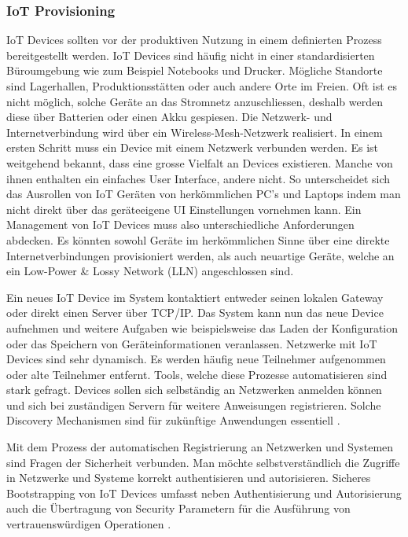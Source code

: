 \subsubsection{IoT Provisioning} IoT Devices sollten vor der produktiven Nutzung in einem definierten Prozess bereitgestellt werden. IoT Devices sind häufig nicht in einer standardisierten Büroumgebung wie zum Beispiel Notebooks und Drucker. Mögliche Standorte sind Lagerhallen, Produktionsstätten oder auch andere Orte im Freien. Oft ist es nicht möglich, solche Geräte an das Stromnetz anzuschliessen, deshalb werden diese über Batterien oder einen Akku gespiesen. Die Netzwerk- und Internetverbindung wird über ein Wireless-Mesh-Netzwerk realisiert. In einem ersten Schritt muss ein Device mit einem Netzwerk verbunden werden. Es ist weitgehend bekannt, dass eine grosse Vielfalt an Devices existieren. Manche von ihnen enthalten ein einfaches User Interface, andere nicht. So unterscheidet sich das Ausrollen von IoT Geräten von herkömmlichen PC's und Laptops indem man nicht direkt über das geräteeigene UI Einstellungen vornehmen kann. Ein Management von IoT Devices muss also unterschiedliche Anforderungen abdecken. Es könnten sowohl Geräte im herkömmlichen Sinne über eine direkte Internetverbindungen provisioniert werden, als auch neuartige Geräte, welche an ein Low-Power \& Lossy Network (LLN) angeschlossen sind.     

Ein neues IoT Device im System kontaktiert entweder seinen lokalen Gateway oder direkt einen Server über TCP/IP. Das System kann nun das neue Device aufnehmen und weitere Aufgaben wie beispielsweise das Laden der Konfiguration oder das Speichern von Geräteinformationen veranlassen. Netzwerke mit IoT Devices sind sehr dynamisch. Es werden häufig neue Teilnehmer aufgenommen oder alte Teilnehmer entfernt. Tools, welche diese Prozesse automatisieren sind stark gefragt. Devices sollen sich selbständig an Netzwerken anmelden können und sich bei zuständigen Servern für weitere Anweisungen registrieren. Solche Discovery Mechanismen sind für zukünftige Anwendungen essentiell \cite{IoTDiscovery10}.

Mit dem Prozess der automatischen Registrierung an Netzwerken und Systemen sind Fragen der Sicherheit verbunden. Man möchte selbstverständlich die Zugriffe in Netzwerke und Systeme korrekt authentisieren und autorisieren. Sicheres Bootstrapping von IoT Devices umfasst neben Authentisierung und Autorisierung auch die Übertragung von Security Parametern für die Ausführung von vertrauenswürdigen Operationen \cite{IoTSecurityChallenges}.
